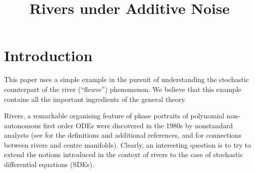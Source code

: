 \documentclass[sn-mathphys-num]{sn-jnl}
\theoremstyle{definition}
\numberwithin{equation}{section} \theoremstyle{remark}
\newcommand{\1}{\mathbbm{1}}
\begin{document}
\title[Rivers under noise]{Rivers under Additive Noise}

\author[1]{ }

\author*[2]{ }





  



\maketitle

\section{Introduction}


This paper uses a simple example in the pursuit of understanding the
stochastic counterpart of the river (``fleuve'') phenomenon. We
believe that this example contains all the important ingredients of the
general theory. 

Rivers, a remarkable organising feature of phase portraits of
polynomial non-autonomous first order ODEs were discovered in the 1980s
by nonstandard analysts (see \cite{Blais} for the definitions and
additional references, and \cite{Diener} for connections between
rivers and centre manifolds).  Clearly, an interesting question is to
try to extend the notions introduced in the context of rivers to the
case of stochastic differential equations (SDEs).
\end{document}

